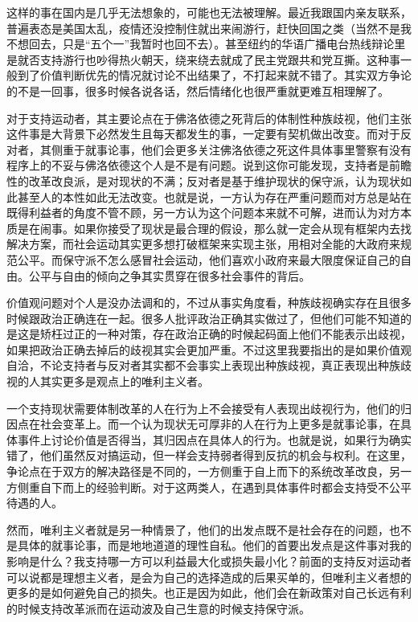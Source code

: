 \documentclass[
]{book}
\begin{document}
这样的事在国内是几乎无法想象的，可能也无法被理解。最近我跟国内亲友联系，普遍表态是美国太乱，疫情还没控制住就出来闹游行，赶快回国之类（当然不是我不想回去，只是``五个一''我暂时也回不去）。甚至纽约的华语广播电台热线辩论里是就否支持游行也吵得热火朝天，绕来绕去就成了民主党跟共和党互撕。这种事一般到了价值判断优先的情况就讨论不出结果了，不打起来就不错了。其实双方争论的不是一回事，很多时候各说各话，然后情绪化也很严重就更难互相理解了。

对于支持运动者，其主要论点在于佛洛依德之死背后的体制性种族歧视，他们主张这件事是大背景下必然发生且每天都发生的事，一定要有契机做出改变。而对于反对者，其侧重于就事论事，他们会更多关注佛洛依德之死这件具体事里警察有没有程序上的不妥与佛洛依德这个人是不是有问题。说到这你可能发现，支持者是前瞻性的改革改良派，是对现状的不满；反对者是基于维护现状的保守派，认为现状如此甚至人的本性如此无法改变。也就是说，一方认为存在严重问题而对方总是站在既得利益者的角度不管不顾，另一方认为这个问题本来就不可解，进而认为对方本质是在闹事。如果你接受了现状是最合理的假设，那么就一定会从现有框架内去找解决方案，而社会运动其实更多想打破框架来实现主张，用相对全能的大政府来规范公平。而保守派不怎么感冒社会运动，他们喜欢小政府来最大限度保证自己的自由。公平与自由的倾向之争其实贯穿在很多社会事件的背后。

价值观问题对个人是没办法调和的，不过从事实角度看，种族歧视确实存在且很多时候跟政治正确连在一起。很多人批评政治正确其实做过了，但他们可能不知道的是这是矫枉过正的一种对策，存在政治正确的时候起码面上他们不能表示出歧视，如果把政治正确去掉后的歧视其实会更加严重。不过这里我要指出的是如果价值观自洽，不论支持者与反对者其实都不会事实上表现出种族歧视，真正表现出种族歧视的人其实更多是观点上的唯利主义者。

一个支持现状需要体制改革的人在行为上不会接受有人表现出歧视行为，他们的归因点在社会变革上。而一个认为现状无可厚非的人在行为上更多是就事论事，在具体事件上讨论价值是否得当，其归因点在具体人的行为。也就是说，如果行为确实错了，他们虽然反对搞运动，但一样会支持弱者得到反抗的机会与权利。在这里，争论点在于双方的解决路径是不同的，一方侧重于自上而下的系统改革改良，另一方侧重自下而上的经验判断。对于这两类人，在遇到具体事件时都会支持受不公平待遇的人。

然而，唯利主义者就是另一种情景了，他们的出发点既不是社会存在的问题，也不是具体的就事论事，而是地地道道的理性自私。他们的首要出发点是这件事对我的影响是什么？我支持哪一方可以利益最大化或损失最小化？前面的支持反对运动者可以说都是理想主义者，是会为自己的选择造成的后果买单的，但唯利主义者想的更多的是如何避免自己的损失。也正是因为如此，他们会在新政策对自己长远有利的时候支持改革派而在运动波及自己生意的时候支持保守派。
\end{document}
